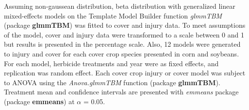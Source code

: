 \documentclass[agriculture,article,submit,moreauthors,pdftex]{mdpi}
\begin{document}
Assuming non-gaussean distribution, beta distribution with generalized
linear mixed-effects models on the Template Model Builder function
\emph{glmmTBM} (package \textbf{glmmTBM}) was fitted to cover and injury
data. To meet assumptions of the model, cover and injury data were
transformed to a scale between 0 and 1 but results is presented in the
percentage scale. Also, 12 models were generated to injury and cover for
each cover crop species presented in corn and soybeans. For each model,
herbicide treatments and year were as fixed effects, and replication was
random effect. Each cover crop injury or cover model was subject to
ANOVA using the \emph{Anova.glmmTBM} function (package
\textbf{glmmTBM}). Treatment mean and confidence intervals are presented
with \emph{emmeans} package (package \textbf{emmeans}) at \(\alpha\) =
0.05.
\end{document}
